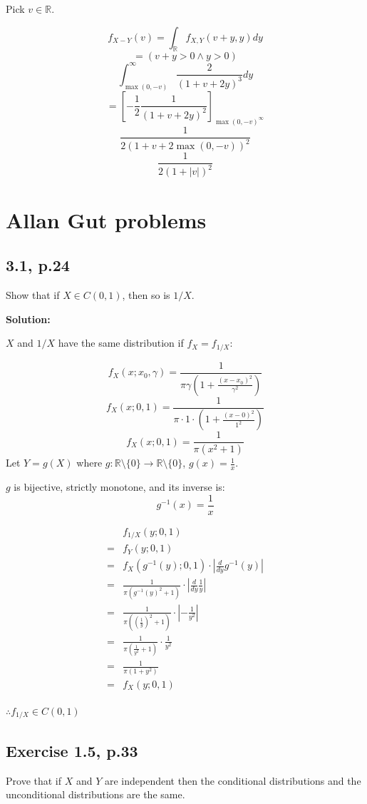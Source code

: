 \documentclass{article}
\begin{document}
Pick \(v\in \mathbb{R}\).

\[f_{X-Y}(v) = \int_\mathbb{R} f_{X,Y}(v+y,y)dy\]
\[=(v+y>0 \wedge y>0)\]
\[\int_{\max(0,-v)}^\infty \frac{2}{(1+v+2y)^3}dy\]
\[=[-\frac{1}{2} \frac{1}{(1+v+2y)^2}]_{\max(0,-v)^\infty}\]
\[\frac{1}{2(1+v+2\max(0,-v))^2}\]
\[\frac{1}{2(1+|v|)^2}\]

\section{Allan Gut problems}
\subsection{3.1, p.24}

Show that if \(X \in C(0,1)\), then so is \(1/X\).

\textbf{Solution:}

\(X\) and \(1/X\) have the same distribution if \(f_X=f_{1/X}\):

\[f_X(x;x_0,\gamma) = \frac{1}{\pi\gamma(1+\frac{(x-x_0)^2}{\gamma^2})}\]
\[f_X(x;0,1) = \frac{1}{\pi \cdot 1 \cdot (1+\frac{(x-0)^2}{1^2})}\]
\[f_X(x;0,1) = \frac{1}{\pi (x^2+1)}\]
Let \(Y=g(X)\) where \(g: \mathbb{R}\setminus\{0\}\to\mathbb{R}\setminus\{0\}\), \(g(x) = \frac{1}{x}\).

\(g\) is bijective, strictly monotone, and its inverse is:
\[g^{-1}(x) = \frac{1}{x}\]

\begin{align*}
 & f_{1/X}(y;0,1) \\
=& f_Y(y;0,1) \\
=& f_X(g^{-1}(y);0,1) \cdot |\frac{d}{dy}g^{-1}(y)| \\
=& \frac{1}{\pi (g^{-1}(y)^2+1)} \cdot |\frac{d}{dy}\frac{1}{y}| \\
=& \frac{1}{\pi ((\frac{1}{y})^2+1)} \cdot |-\frac{1}{y^2}| \\
=& \frac{1}{\pi (\frac{1}{y^2}+1)} \cdot \frac{1}{y^2} \\
=& \frac{1}{\pi (1+y^2)} \\
=& f_X(y;0,1) \\
\end{align*}

\(\therefore f_{1/X}\in C(0,1)\)

\subsection{Exercise 1.5, p.33}

Prove that if \(X\) and \(Y\) are independent
then the conditional distributions and the unconditional distributions are the same.
\end{document}
